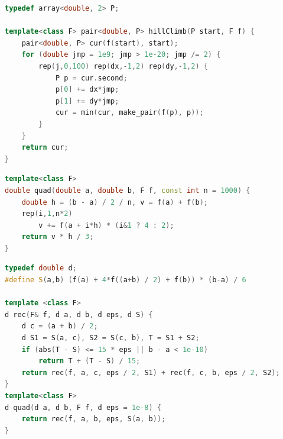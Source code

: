 \begin{multicols}{\Columns}
\begin{lstlisting}[language=C++]
typedef array<double, 2> P;

template<class F> pair<double, P> hillClimb(P start, F f) {
	pair<double, P> cur(f(start), start);
	for (double jmp = 1e9; jmp > 1e-20; jmp /= 2) {
		rep(j,0,100) rep(dx,-1,2) rep(dy,-1,2) {
			P p = cur.second;
			p[0] += dx*jmp;
			p[1] += dy*jmp;
			cur = min(cur, make_pair(f(p), p));
		}
	}
	return cur;
}
\end{lstlisting}

\begin{lstlisting}[language=C++]
template<class F>
double quad(double a, double b, F f, const int n = 1000) {
	double h = (b - a) / 2 / n, v = f(a) + f(b);
	rep(i,1,n*2)
		v += f(a + i*h) * (i&1 ? 4 : 2);
	return v * h / 3;
}
\end{lstlisting}

\begin{lstlisting}[language=C++]
typedef double d;
#define S(a,b) (f(a) + 4*f((a+b) / 2) + f(b)) * (b-a) / 6

template <class F>
d rec(F& f, d a, d b, d eps, d S) {
	d c = (a + b) / 2;
	d S1 = S(a, c), S2 = S(c, b), T = S1 + S2;
	if (abs(T - S) <= 15 * eps || b - a < 1e-10)
		return T + (T - S) / 15;
	return rec(f, a, c, eps / 2, S1) + rec(f, c, b, eps / 2, S2);
}
template<class F>
d quad(d a, d b, F f, d eps = 1e-8) {
	return rec(f, a, b, eps, S(a, b));
}
\end{lstlisting}


\end{multicols}
